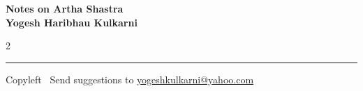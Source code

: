 \documentclass[9pt,a4paper,landscape]{article}
\begin{document}
\footnotesize


\begin{center}
\Large{\textbf{Notes on Artha Shastra\\ Yogesh Haribhau Kulkarni}}  
\end{center}

\begin{multicols}{2}

\end{multicols}

\rule{\linewidth}{0.25pt}
\scriptsize
Copyleft \textcopyleft\  Send suggestions to 
\href{http://www.yogeshkulkarni.com}{yogeshkulkarni@yahoo.com}
\end{document}
